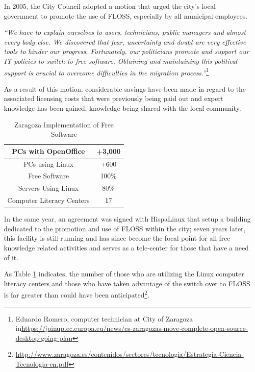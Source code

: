 In 2005, the City Council adopted a motion that urged the city’s local government to promote the use of  FLOSS, especially by all municipal employees. 

\textit{``We have to explain ourselves to users, technicians, public managers and almost every body else. We discovered that fear, uncertainty and doubt are very effective tools to hinder our progress. Fortunately, our politicians promote and support our IT policies to switch to free software. Obtaining and maintaining this political support is crucial to overcome difficulties in the migration process.''}\footnote{Eduardo Romero, computer technician at City of Zaragoza in\url{https://joinup.ec.europa.eu/news/es-zaragozas-move-complete-open-source-desktop-going-plan}}

As a result of this motion, considerable savings have been made in regard to the associated licensing costs that were previously being paid out and expert knowledge has been gained, knowledge being shared with the local community. 
\begin{table}[H] \centering

\begin{tabular}{| c| c |}
\hline
PCs with OpenOffice & +3,000\\\hline
PCs using Linux   & +600  \\ \hline
Free Software      & 100\%  \\ \hline
Servers Using Linux  & 80\% \\ \hline
Computer Literacy Centers & 17   \\
\hline
\end{tabular}
\caption{Zaragoza Implementation of Free Software}
\label{table:Zaragoza implementation}
\end{table}

In the same year, an agreement was signed with HispaLinux that setup a building dedicated to the promotion and use of   FLOSS within the city; seven years later, this facility is still running and has since become the focal point for all free knowledge related activities and serves as a tele-center for those that have a need of it.

As Table \ref{table:Zaragoza implementation} indicates, the number of those who are utilizing the Linux computer literacy centers and those who have taken advantage of the switch over to FLOSS is far greater than could have been anticipated\footnote{\url{http://www.zaragoza.es/contenidos/sectores/tecnologia/Estrategia-Ciencia-Tecnologia-en.pdf}}.


